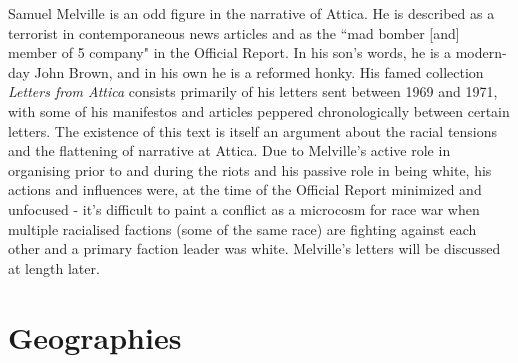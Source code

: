 \documentclass[14pt, letterpaper]{report}
\begin{document}
	Samuel Melville is an odd figure in the narrative of Attica. He is described 
	as a terrorist in contemporaneous news articles and as the ``mad bomber [and]
	member of 5 company" in the Official Report. In his son's words, he is a 
	modern-day John Brown\autocite{atticas-ashes}, and in his own he is a 
	reformed honky.\autocite[53]{letters-from-attica} \footnotemark His famed 
	collection \textit{Letters from Attica} consists primarily of his letters 
	sent between 1969 and 1971, with some of his manifestos and articles peppered 
	chronologically between certain letters. The existence of this text is itself 
	an argument about the racial tensions and the flattening of narrative at 
	Attica. Due to Melville's active role in organising prior to and during 
	the riots and his passive role in being white, his actions and influences 
	were, at the time of the Official Report minimized and unfocused - it's 
	difficult to paint a conflict as a microcosm for race war when multiple 
	racialised factions (some of the same race) are fighting against each other 
	and a primary faction leader was white. Melville's letters will be discussed 
	at length later.
    
	
    \section*{Geographies}
    
\end{document}

